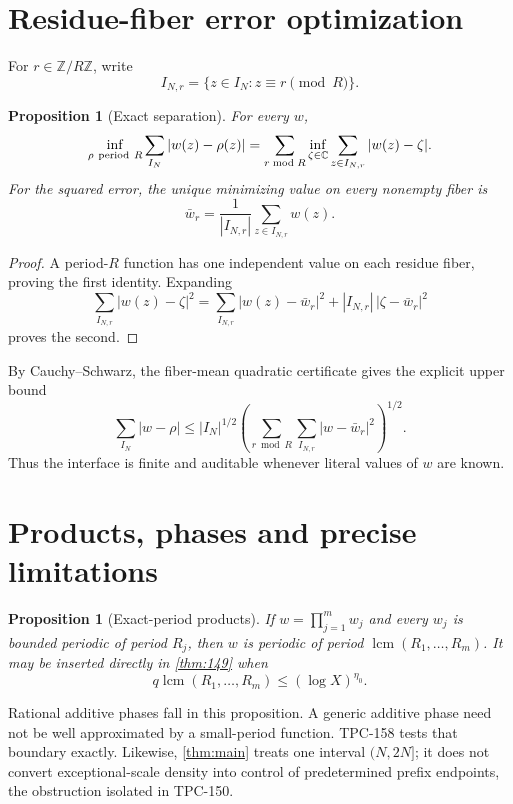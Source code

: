 \documentclass[11pt]{article}
\newtheorem{proposition}[theorem]{Proposition}
\theoremstyle{definition}
\begin{document}
\section{Residue-fiber error optimization}

For \(r\in\mathbb Z/R\mathbb Z\), write
\[
 I_{N,r}=\{z\in I_N:z\equiv r\pmod R\}.
\]

\begin{proposition}[Exact separation]\label{prop:separate}
For every \(w\),
\[
 \inf_{\rho\ {\rm period}\ R}\sum_{I_N}|w(z)-\rho(z)|
 =
 \sum_{r\bmod R}\inf_{\zeta\in\mathbb C}
 \sum_{z\in I_{N,r}}|w(z)-\zeta|.
\]
For the squared error, the unique minimizing value on every nonempty
fiber is
\[
 \bar w_r=\frac1{|I_{N,r}|}\sum_{z\in I_{N,r}}w(z).
\]
\end{proposition}

\begin{proof}
A period-\(R\) function has one independent value on each residue
fiber, proving the first identity.  Expanding
\[
 \sum_{I_{N,r}}|w(z)-\zeta|^2
 =
 \sum_{I_{N,r}}|w(z)-\bar w_r|^2
 +|I_{N,r}|\,|\zeta-\bar w_r|^2
\]
proves the second.
\end{proof}

By Cauchy--Schwarz, the fiber-mean quadratic certificate gives the
explicit upper bound
\[
 \sum_{I_N}|w-\rho|
 \le |I_N|^{1/2}
 \left(\sum_{r\bmod R}\sum_{I_{N,r}}|w-\bar w_r|^2\right)^{1/2}.
\]
Thus the interface is finite and auditable whenever literal values of
\(w\) are known.

\section{Products, phases and precise limitations}

\begin{proposition}[Exact-period products]\label{prop:product}
If \(w=\prod_{j=1}^m w_j\) and every \(w_j\) is bounded periodic of
period \(R_j\), then \(w\) is periodic of period
\(\operatorname{lcm}(R_1,\ldots,R_m)\).  It may be inserted directly
in \cref{thm:149} when
\[
 q\operatorname{lcm}(R_1,\ldots,R_m)
 \le(\log X)^{\eta_0}.
\]
\end{proposition}

Rational additive phases fall in this proposition.  A generic
additive phase need not be well approximated by a small-period
function.  TPC-158 tests that boundary exactly.  Likewise,
\cref{thm:main} treats one interval \((N,2N]\); it does not convert
exceptional-scale density into control of predetermined prefix
endpoints, the obstruction isolated in TPC-150.
\end{document}
